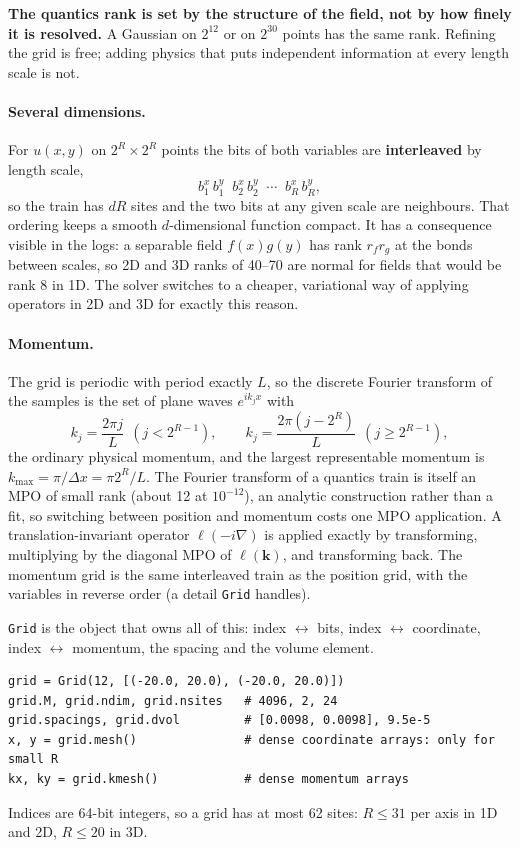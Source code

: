 \documentclass[11pt,a4paper]{article}
\newcommand{\code}[1]{\texttt{#1}}
\newcommand{\kmax}{k_{\max}}
\newcommand{\vk}{\mathbf{k}}
\begin{document}
\begin{finding}
\textbf{The quantics rank is set by the structure of the field, not by how finely it
is resolved.} A Gaussian on $2^{12}$ or on $2^{30}$ points has the same rank. Refining
the grid is free; adding physics that puts independent information at every length
scale is not.
\end{finding}

\paragraph{Several dimensions.} For $u(x,y)$ on $2^R\times2^R$ points the bits of both
variables are \textbf{interleaved} by length scale,
\begin{equation}
b^x_1\,b^y_1\;\;b^x_2\,b^y_2\;\;\cdots\;\;b^x_R\,b^y_R,
\end{equation}
so the train has $dR$ sites and the two bits at any given scale are neighbours. That
ordering keeps a smooth $d$-dimensional function compact. It has a consequence visible
in the logs: a separable field $f(x)g(y)$ has rank $r_f r_g$ at the bonds between
scales, so 2D and 3D ranks of 40--70 are normal for fields that would be rank 8 in 1D.
The solver switches to a cheaper, variational way of applying operators in 2D and 3D
for exactly this reason.

\paragraph{Momentum.} The grid is periodic with period exactly $L$, so the discrete
Fourier transform of the samples is the set of plane waves $e^{ik_jx}$ with
\begin{equation}
k_j=\frac{2\pi j}{L}\ \ (j<2^{R-1}),\qquad k_j=\frac{2\pi (j-2^R)}{L}\ \ (j\ge2^{R-1}),
\end{equation}
the ordinary physical momentum, and the largest representable momentum is
$\kmax=\pi/\Delta x=\pi 2^R/L$. The Fourier transform of a quantics train is itself an
MPO of small rank (about 12 at $10^{-12}$), an analytic construction rather than a fit,
so switching between position and momentum costs one MPO application. A
translation-invariant operator $\ell(-i\nabla)$ is applied exactly by transforming,
multiplying by the diagonal MPO of $\ell(\vk)$, and transforming back. The momentum grid
is the same interleaved train as the position grid, with the variables in reverse
order (a detail \code{Grid} handles).

\code{Grid} is the object that owns all of this: index $\leftrightarrow$ bits, index
$\leftrightarrow$ coordinate, index $\leftrightarrow$ momentum, the spacing and the
volume element.
\begin{lstlisting}
grid = Grid(12, [(-20.0, 20.0), (-20.0, 20.0)])
grid.M, grid.ndim, grid.nsites   # 4096, 2, 24
grid.spacings, grid.dvol         # [0.0098, 0.0098], 9.5e-5
x, y = grid.mesh()               # dense coordinate arrays: only for small R
kx, ky = grid.kmesh()            # dense momentum arrays
\end{lstlisting}
Indices are 64-bit integers, so a grid has at most 62 sites: $R\le31$ per axis in 1D
and 2D, $R\le20$ in 3D.
\end{document}
